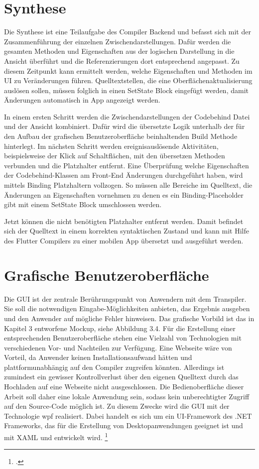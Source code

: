 \section{Synthese}

Die Synthese ist eine Teilaufgabe des Compiler Backend  und befasst sich mit der Zusammenführung der einzelnen Zwischendarstellungen.  Dafür werden die gesamten Methoden und Eigenschaften aus der logischen Darstellung in die Ansicht überführt und die Referenzierungen dort entsprechend angepasst.  Zu diesem Zeitpunkt kann ermittelt werden, welche Eigenschaften und Methoden im UI zu 
Veränderungen führen.   Quelltextstellen,  die eine Oberflächenaktualisierung auslösen sollen,  müssen folglich in einen SetState Block eingefügt werden, damit Änderungen automatisch in App angezeigt werden.


In einem ersten Schritt werden die Zwischendarstellungen der Codebehind Datei und der Ansicht kombiniert.  Dafür wird die übersetzte Logik unterhalb der für den Aufbau der grafischen Benutzeroberfläche beinhaltenden Build Methode hinterlegt.  Im nächsten Schritt werden ereignisauslösende Aktivitäten, beispielsweise der Klick auf 
Schaltflächen,  mit den übersetzen Methoden verbunden und die Platzhalter entfernt. Eine Überprüfung welche Eigenschaften der Codebehind-Klassen am Front-End Änderungen durchgeführt haben, wird mittels Binding Platzhaltern vollzogen.  So müssen alle Bereiche im Quelltext, die Änderungen an Eigenschaften vornehmen zu denen es ein Binding-Placeholder gibt mit einem SetState Block umschlossen werden.


Jetzt können die nicht benötigten Platzhalter entfernt werden.  Damit befindet sich der Quelltext in einem korrekten syntaktischen Zustand und kann mit Hilfe des Flutter Compilers zu einer mobilen App übersetzt und ausgeführt werden. 


\section{Grafische Benutzeroberfläche}
Die GUI ist der zentrale Berührungspunkt von Anwendern mit dem Transpiler.  Sie soll die notwendigen Eingabe-Möglichkeiten anbieten, das Ergebnis ausgeben und den Anwender auf mögliche Fehler hinweisen.  Das grafische Vorbild ist das in Kapitel 3 entworfene Mockup, siehe Abbildung 3.4.  Für die Erstellung einer entsprechenden Benutzeroberfläche stehen eine Vielzahl von Technologien mit verschiedenen Vor- und Nachteilen zur Verfügung.  Eine Webseite wäre von Vorteil, da Anwender keinen Installationsaufwand hätten und  plattformunabhängig auf den Compiler zugreifen könnten.  Allerdings ist zumindest ein gewisser Kontrollverlust über den eigenen Quelltext durch das  Hochladen auf eine Webseite nicht ausgeschlossen.  Die Bedienoberfläche dieser Arbeit soll daher eine lokale Anwendung sein, sodass kein  unberechtigter Zugriff auf den Source-Code möglich ist. Zu diesem Zwecke wird die GUI mit der Technologie \ac{wpf}  realisiert. Dabei handelt es sich um ein UI-Framework des .NET Frameworks, das für die Erstellung von Desktopanwendungen geeignet ist und mit XAML und \Csharp entwickelt wird. \footcite[Vgl.][S. 1f]{Wenger2012} 

